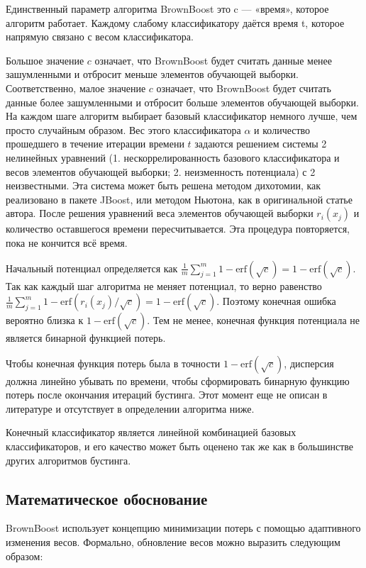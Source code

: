 Единственный параметр алгоритма BrownBoost это c — «время», которое алгоритм работает. Каждому слабому классификатору даётся время t, которое напрямую связано с весом классификатора.

Большое значение $c$ означает, что BrownBoost будет считать данные менее зашумленными и отбросит меньше элементов обучающей выборки. Соответственно, малое значение $c$ означает, что BrownBoost будет считать данные более зашумленными и отбросит больше элементов обучающей выборки. На каждом шаге алгоритм выбирает базовый классификатор немного лучше, чем просто случайным образом. Вес этого классификатора $\alpha$ и количество прошедшего в течение итерации времени $t$ задаются решением системы 2 нелинейных уравнений (1. нескоррелированность базового классификатора и весов элементов обучающей выборки; 2. неизменность потенциала) с 2 неизвестными. Эта система может быть решена методом дихотомии, как реализовано в пакете JBoost, или методом Ньютона, как в оригинальной статье автора. После решения уравнений веса элементов обучающей выборки $r_i(x_j)$ и количество оставшегося времени пересчитывается. Эта процедура повторяется, пока не кончится всё время.

Начальный потенциал определяется как
${\frac {1}{m}}\sum _{j=1}^{m}1-{\mbox{erf}}({\sqrt {c}})=1-{\mbox{erf}}({\sqrt {c}})$. Так как каждый шаг алгоритма не меняет потенциал, то верно равенство
${\frac {1}{m}}\sum _{j=1}^{m}1-{\mbox{erf}}(r_{i}(x_{j})/{\sqrt {c}})=1-{\mbox{erf}}({\sqrt {c}})$. Поэтому конечная ошибка вероятно близка к
$1-{\mbox{erf}}({\sqrt {c}})$. Тем не менее, конечная функция потенциала не является бинарной функцией потерь.

Чтобы конечная функция потерь была в точности
$1-{\mbox{erf}}({\sqrt {c}})$, дисперсия должна линейно убывать по времени, чтобы сформировать бинарную функцию потерь после окончания итераций бустинга. Этот момент еще не описан в литературе и отсутствует в определении алгоритма ниже.

Конечный классификатор является линейной комбинацией базовых классификаторов, и его качество может быть оценено так же как в большинстве других алгоритмов бустинга.

\subsection*{Математическое обоснование}
BrownBoost использует концепцию минимизации потерь с помощью адаптивного изменения весов. Формально, обновление весов можно выразить следующим образом:

